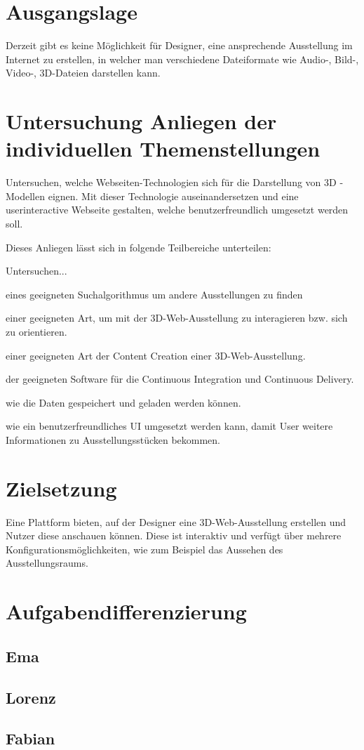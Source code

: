 \section{Ausgangslage}
Derzeit gibt es keine Möglichkeit für Designer, eine ansprechende Ausstellung im Internet zu erstellen, in welcher man verschiedene Dateiformate wie Audio-, Bild-, Video-, 3D-Dateien darstellen kann.

\section{Untersuchung Anliegen der individuellen Themenstellungen}
Untersuchen, welche Webseiten-Technologien sich für die Darstellung von 3D - Modellen eignen. Mit dieser Technologie auseinandersetzen und eine userinteractive Webseite gestalten, welche benutzerfreundlich umgesetzt werden soll.

Dieses Anliegen lässt sich in folgende Teilbereiche unterteilen:

Untersuchen...
\begin{compactitem}
    \item eines geeigneten Suchalgorithmus um andere Ausstellungen zu finden
    \item einer geeigneten Art, um mit der 3D-Web-Ausstellung zu interagieren bzw. sich zu orientieren.
    \item einer geeigneten Art der Content Creation einer 3D-Web-Ausstellung.
    \item der geeigneten Software für die Continuous Integration und Continuous Delivery.
    \item wie die Daten gespeichert und geladen werden können.
    \item wie ein benutzerfreundliches UI umgesetzt werden kann, damit User weitere Informationen zu Ausstellungsstücken bekommen.
\end{compactitem}

\section{Zielsetzung}
Eine Plattform bieten, auf der Designer eine 3D-Web-Ausstellung erstellen und Nutzer diese anschauen können. Diese ist interaktiv und verfügt über mehrere Konfigurationsmöglichkeiten, wie zum Beispiel das Aussehen des Ausstellungsraums.

\section{Aufgabendifferenzierung}
\subsection{Ema}
\subsection{Lorenz}
\subsection{Fabian}
	
